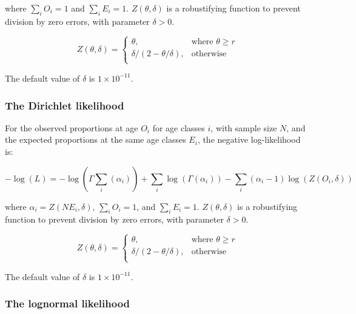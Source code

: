 where $\sum\limits_i O_i = 1$ and $\sum\limits_i E_i = 1$. $Z \left(\theta,\delta \right)$ is a robustifying function to prevent division by zero errors, with parameter $\delta>0$.

\begin{equation}
Z \left(\theta,\delta \right) = \begin{cases}
\theta, & \text{where $\theta \ge r$} \\
\delta/\left( 2-\theta/\delta \right), & \text{otherwise} \\
\end{cases}
\end{equation}

The default value of $\delta$ is $1 \times 10^{-11}$.

\subsubsection*{The Dirichlet likelihood}

For the observed proportions at age $O_i$ for age classes $i$, with sample size $N$, and the expected proportions at the same age classes $E_i$, the negative log-likelihood is:

\begin{equation}
-\log \left(L \right) = -\log(\Gamma \sum\limits_i (\alpha_i)) + \sum\limits_i \log(\Gamma (\alpha_i)) - \sum\limits_i (\alpha_i-1) \log(Z(O_i,\delta))
\end{equation}

where $\alpha_i = Z \left(N E_i,\delta \right)$, $\sum\limits_i O_i = 1$, and $\sum\limits_i E_i = 1$. $Z \left(\theta,\delta \right)$ is a robustifying function to prevent division by zero errors, with parameter $\delta>0$.

\begin{equation}
Z \left(\theta,\delta \right) = \begin{cases}
\theta, & \text{where $\theta \ge r$} \\
\delta/\left( 2-\theta/\delta \right), & \text{otherwise} \\
\end{cases}
\end{equation}

The default value of $\delta$ is $1 \times 10^{-11}$.

\subsubsection*{The lognormal likelihood}

